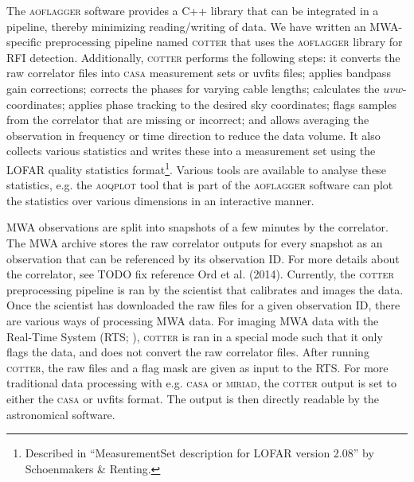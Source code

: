 \documentclass{pasa}
\begin{document}
The \textsc{aoflagger} software provides a C++ library%
that can be integrated in a pipeline, thereby minimizing reading/writing of data. We have written an MWA-specific preprocessing pipeline named \textsc{cotter} that uses the \textsc{aoflagger} library for RFI detection. Additionally, \textsc{cotter} performs the following steps: it converts the raw correlator files into \textsc{casa} measurement sets or uvfits files; applies bandpass gain corrections; corrects the phases for varying cable lengths; calculates the $uvw$-coordinates; applies phase tracking to the desired sky coordinates; flags samples from the correlator that are missing or incorrect; and allows averaging the observation in frequency or time direction to reduce the data volume. It also collects various statistics and writes these into a measurement set using the LOFAR quality statistics format\footnote{Described in ``MeasurementSet description for LOFAR version 2.08'' by Schoenmakers \& Renting.}. Various tools are available to analyse these statistics, e.g. the \textsc{aoqplot} tool that is part of the \textsc{aoflagger} software can plot the statistics over various dimensions in an interactive manner.

MWA observations are split into snapshots of a few minutes by the correlator. The MWA archive stores the raw correlator outputs for every snapshot as an observation that can be referenced by its observation ID. For more details about the correlator, see TODO fix reference Ord et al. (2014). Currently, the \textsc{cotter} preprocessing pipeline is ran by the scientist that calibrates and images the data. Once the scientist has downloaded the raw files for a given observation ID, there are various ways of processing MWA data. For imaging MWA data with the Real-Time System (RTS; \citealt{rts-mwa-2008}), \textsc{cotter} is ran in a special mode such that it only flags the data, and does not convert the raw correlator files. After running \textsc{cotter}, the raw files and a flag mask are given as input to the RTS. For more traditional data processing with e.g. \textsc{casa} or \textsc{miriad}, the \textsc{cotter} output is set to either the \textsc{casa} or uvfits format. The output is then directly readable by the astronomical software.
\end{document}
